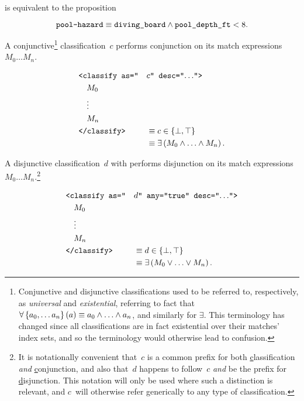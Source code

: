 \noindent
is equivalent to the proposition

\begin{equation*}
  \texttt{pool-hazard} \equiv \texttt{diving\_board}
    \wedge \texttt{pool\_depth\_ft} < 8.
\end{equation*}

\goodbreak
{}
\begin{definition}
  A conjunctive\footnote{%
    Conjunctive and disjunctive classifications used to be referred to,
      respectively,
      as \emph{universal} and \emph{existential},
        referring to fact that
          $\forall\left\{a_0,\ldots a_n\right\}(a) \equiv a_0\wedge\ldots\wedge a_n$,
            and similarly for $\exists$.
    This terminology has changed since all classifications are in fact
      existential over their matches' index sets,
        and so the terminology would otherwise lead to confusion.
    }
    classification~$c$ performs conjunction on its match expressions
      $M_0\ldots M_n$.

  \begin{alignat*}{2}
    &\texttt{<classify as="}&&c\texttt{" desc="$\ldots$">} \\
    &\quad M_0 \\
    &\quad \vdots \\
    &\quad M_n \\
    &\texttt{</classify>}
      &&\equiv c\in\{\bot,\top\} \\
    & &&\equiv \exists\left( M_0 \wedge \ldots \wedge M_n \right).
  \end{alignat*}
\end{definition}

\begin{definition}
  A disjunctive classification~$d$ with 
    performs disjunction on its match expressions
    $M_0\ldots M_n$.\footnote{%
      It is notationally convenient that~$c$ is a common prefix for both
        \underline{c}lassification \emph{and} \underline{c}onjunction,
          and also that~$d$ happens to follow~$c$ \emph{and} be the prefix for
          \underline{d}isjunction.
      This notation will only be used where such a distinction is relevant,
        and $c$~will otherwise refer generically to any type of
        classification.}

  \begin{alignat*}{2}
    &\texttt{<classify as="} &&d\texttt{" any="true" desc="$\ldots$">} \\
    &\quad M_0 \\
    &\quad \vdots \\
    &\quad M_n \\
    &\texttt{</classify>}
      &&\equiv d\in\{\bot,\top\} \\
    & &&\equiv \exists\left( M_0 \vee \ldots \vee M_n \right).
  \end{alignat*}
\end{definition}


